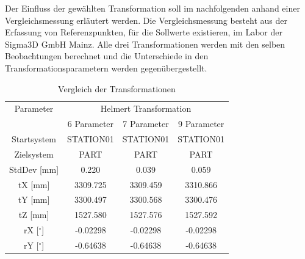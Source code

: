 Der Einfluss der gewählten Transformation soll im nachfolgenden anhand einer Vergleichsmessung erläutert werden. Die Vergleichsmessung besteht aus der Erfassung von Referenzpunkten, für die Sollwerte existieren, im Labor der Sigma3D GmbH Mainz. Alle drei Transformationen werden mit den selben Beobachtungen berechnet und die Unterschiede in den Transformationsparametern werden gegenübergestellt.\\

\begin{table}[H]\label{tab:trafos}
\centering
\caption{Vergleich der Transformationen}

\begin{tabular}{cccc}
\toprule
\multicolumn{1}{p{2cm}|}{Parameter} &
\multicolumn{3}{c}{Helmert Transformation} \\
\multicolumn{1}{c|}{} &
\multicolumn{1}{c|}{6 Parameter} &
\multicolumn{1}{c|}{7 Parameter} &
\multicolumn{1}{c}{9 Parameter} \\
\midrule

\multicolumn{1}{c|}{Startsystem} &
\multicolumn{1}{c|}{STATION01} &
\multicolumn{1}{c|}{STATION01} &
\multicolumn{1}{c}{STATION01} \\

\multicolumn{1}{c|}{Zielsystem} &
\multicolumn{1}{c|}{PART} &
\multicolumn{1}{c|}{PART} &
\multicolumn{1}{c}{PART} \\

\multicolumn{1}{c|}{StdDev [mm]} &
\multicolumn{1}{c|}{0.220} &
\multicolumn{1}{c|}{0.039} &
\multicolumn{1}{c}{0.059} \\

\multicolumn{1}{c|}{tX [mm]} &
\multicolumn{1}{c|}{3309.725} &
\multicolumn{1}{c|}{3309.459} &
\multicolumn{1}{c}{3310.866} \\

\multicolumn{1}{c|}{tY [mm]} &
\multicolumn{1}{c|}{3300.497} &
\multicolumn{1}{c|}{3300.568} &
\multicolumn{1}{c}{3300.476} \\

\multicolumn{1}{c|}{tZ [mm]} &
\multicolumn{1}{c|}{1527.580} &
\multicolumn{1}{c|}{1527.576} &
\multicolumn{1}{c}{1527.592} \\

\multicolumn{1}{c|}{rX [$^\circ$]} &
\multicolumn{1}{c|}{-0.02298} &
\multicolumn{1}{c|}{-0.02298} &
\multicolumn{1}{c}{-0.02298} \\

\multicolumn{1}{c|}{rY [$^\circ$]} &
\multicolumn{1}{c|}{-0.64638} &
\multicolumn{1}{c|}{-0.64638} &
\multicolumn{1}{c}{-0.64638} \\


\end{tabular}
\end{table}
